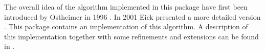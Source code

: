 The overall idea of the algorithm implemented in this package have
first been introduced 
by Ostheimer in 1996 \cite{Ostheimer}. 
In 2001 Eick presented a more detailed
version \cite{Eick}. This package contains an implementation of this
algorithm. A description of this implementation together with some
refinements and extensions can be
found in \cite{Assmann}. 







